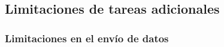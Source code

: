 \subsection{Limitaciones de tareas adicionales}

\subsubsection{Limitaciones en el envío de datos}

